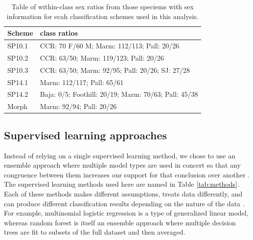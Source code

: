 \documentclass[10pt,letterpaper]{article}
\begin{document}
\begin{table}
  \centering
  \caption{Table of within-class sex ratios from those speciems with sex information for ecah classification schemes used in this analysis.}
    \begin{tabular}{l l}
      \hline
      Scheme & class ratios \\
      \hline
      SP10.1 & CCR: 70 F/60 M; Marm: 112/113; Pall: 20/26 \\
      SP10.2 &  CCR: 63/50; Marm: 119/123; Pall: 20/26 \\
      SP10.3 & CCR: 63/50; Marm: 92/95; Pall: 20/26; SJ: 27/28 \\
      SP14.1 & Marm: 112/117; Pall: 65/61 \\
      SP14.2 & Baja: 0/5; Foothill: 20/19; Marm: 70/63; Pall: 45/38\\
      Morph & Marm: 92/94; Pall: 20/26 \\
      \hline
    \end{tabular}
  \label{tab:sex_ratio}
\end{table}



\subsection*{Supervised learning approaches}

Instead of relying on a single supervised learning method, we chose to use an ensemble approach where multiple model types are used in concert so that any congruence between them increases our support for that conclusion over another \cite{Hastie2009}. The supervised learning methods used here are named in Table \ref{tab:methods}. Each of these methods makes different assumptions, treats data differently, and can produce different classification results depending on the nature of the data \cite{Hastie2009}. For example, multinomial logistic regression is a type of generalized linear model, whereas random forest is itself an ensemble approach where multiple decision trees are fit to subsets of the full dataset and then averaged.

\begin{table}
  \centering
  \caption{Table of the supervised learning methods used in this analysis.}
  \label{tab:methods}
\end{table}
\end{document}

